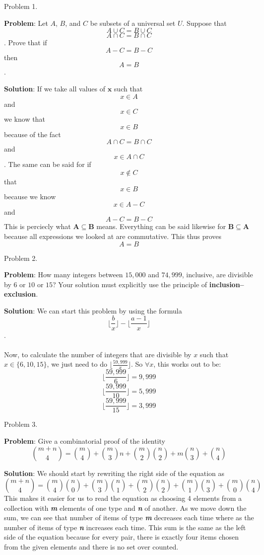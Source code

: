\documentclass{article}
\begin{document}
Problem 1.

\textbf{Problem}: Let $A$, $B$, and $C$ be subsets of a universal set $U$. Suppose that $$A \cup C = B \cup C$$ $$A \cap C = B \cap C$$. Prove that if $$A - C = B - C$$ then $$A = B$$.

\textbf{Solution}: If we take all values of $\boldsymbol{x}$ such that $$x \in A$$ and $$x \in C$$ we know that $$x \in B$$ because of the fact $$A \cap C = B \cap C$$ and $$x \in A \cap C$$. The same can be said for if $$x \notin C$$ that $$x \in B$$ because we know $$x \in A - C$$ and $$A - C = B - C$$ This is perciecly what $\boldsymbol{A \subseteq B}$ means. Everything can be said likewise for $\boldsymbol{B \subseteq A}$ because all expressions we looked at are commutative. This thus proves $$A = B$$ 


Problem 2.

\textbf{Problem}: How many integers between $15,000$ and $74,999$, inclusive, are divisible by $6$ or $10$ or $15$?
Your solution must explicitly use the principle of \textbf{inclusion–exclusion}.

\textbf{Solution}: We can start this problem by using the formula $$\lfloor\frac{b}{x}\rfloor - \lfloor\frac{a-1}{x}\rfloor$$. \\ \\ Now, to calculate the number of integers that are divisible by $x$ such that $x \in \{6, 10, 15\}$, we just need to do $\lfloor{\frac{59,999}{x}\rfloor}$. So $\forall x$, this works out to be: $$\lfloor{\frac{59,999}{6}\rfloor} = 9,999$$ $$\lfloor{\frac{59,999}{10}\rfloor} = 5,999$$ $$\lfloor{\frac{59,999}{15}\rfloor} = 3,999$$

Problem 3.

\textbf{Problem}: Give a combinatorial proof of the identity $$\binom{m+n}{4} = \binom{m}{4} + \binom{m}{3}n + \binom{m}{2}\binom{n}{2} + m\binom{n}{3} + \binom{n}{4}$$

\textbf{Solution}: We should start by rewriting the right side of the equation as $$\binom{m+n}{4} = \binom{m}{4}\binom{n}{0} + \binom{m}{3}\binom{n}{1} + \binom{m}{2}\binom{n}{2} + \binom{m}{1}\binom{n}{3} + \binom{m}{0}\binom{n}{4}$$ This makes it easier for us to read the equation as choosing 4 elements from a collection with \textbf{\textit{m}} elements of one type and \textbf{\textit{n}} of another. As we move down the sum, we can see that number of items of type \textbf{\textit{m}} decreases each time where as the number of items of type \textbf{\textit{n}} increases each time. This sum is the same as the left side of the equation because for every pair, there is exactly four items chosen from the given elements and there is no set over counted.
\end{document}

